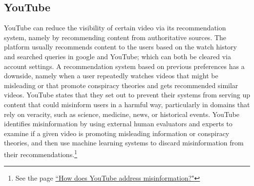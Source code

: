 \documentclass{article}
\begin{document}

\subsection{YouTube}

YouTube can reduce the visibility of certain video via its recommendation system, namely by recommending content from authoritative sources.
The platform usually recommends content to the users based on the watch history and searched queries in google and YouTube; which can both be cleared via account settings.
A recommendation system based on previous preferences has a downside, namely when a user repeatedly watches videos that might be misleading or that promote conspiracy theories and gets recommended similar videos.
YouTube states that they set out to prevent their systems from serving up content that could misinform users in a harmful way, particularly in domains that rely on veracity, such as science, medicine, news, or historical events.
YouTube identifies misinformation by using external human evaluators and experts to examine if a given video is promoting misleading information or conspiracy theories, and then use machine learning systems to discard misinformation from their recommendations.\footnote{See the page \href{https://www.youtube.com/intl/ALL_ca/howyoutubeworks/our-commitments/fighting-misinformation/}{``How does YouTube address misinformation?"}}

\smallskip
\end{document}
